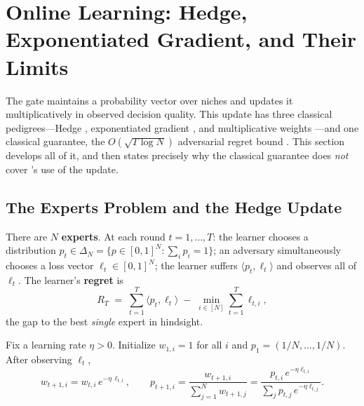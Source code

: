 \section{Online Learning: Hedge, Exponentiated Gradient, and Their Limits}
\label{sec:dd1-online}

The \nm{} gate maintains a probability vector over niches and updates it
multiplicatively in observed decision quality. This update has three classical
pedigrees---Hedge \cite{freund1997decision}, exponentiated gradient
\cite{kivinen1997exponentiated}, and multiplicative weights
\cite{arora2012multiplicative}---and one classical guarantee, the
$O(\sqrt{T \log N})$ adversarial regret bound \cite{cesa2006prediction}. This
section develops all of it, and then states precisely why the classical
guarantee does \emph{not} cover \nm{}'s use of the update.

\subsection{The Experts Problem and the Hedge Update}

\begin{definition}
\label{def:dd1-experts}
There are $N$ \textbf{experts}. At each round $t = 1, \dots, T$: the learner
chooses a distribution $p_t \in \Delta_N = \{p \in [0,1]^N : \sum_i p_i =
1\}$; an adversary simultaneously chooses a loss vector
$\ell_t \in [0, 1]^N$; the learner suffers $\langle p_t, \ell_t \rangle$ and
observes all of $\ell_t$. The learner's \textbf{regret} is
\begin{equation}
\label{eq:dd1-experts-regret}
R_T \;=\; \sum_{t=1}^T \langle p_t, \ell_t \rangle
\;-\; \min_{i \in [N]} \sum_{t=1}^T \ell_{t,i},
\end{equation}
the gap to the best \emph{single} expert in hindsight.
\end{definition}

\begin{definition}
\label{def:dd1-hedge}
Fix a learning rate $\eta > 0$. Initialize $w_{1,i} = 1$ for all $i$ and
$p_1 = (1/N, \dots, 1/N)$. After observing $\ell_t$,
\begin{equation}
\label{eq:dd1-hedge}
w_{t+1, i} = w_{t, i}\, e^{-\eta\, \ell_{t,i}},
\qquad
p_{t+1, i} = \frac{w_{t+1, i}}{\sum_{j=1}^N w_{t+1, j}}
= \frac{p_{t,i}\, e^{-\eta \ell_{t,i}}}{\sum_j p_{t,j}\, e^{-\eta
\ell_{t,j}}}.
\end{equation}
\end{definition}

